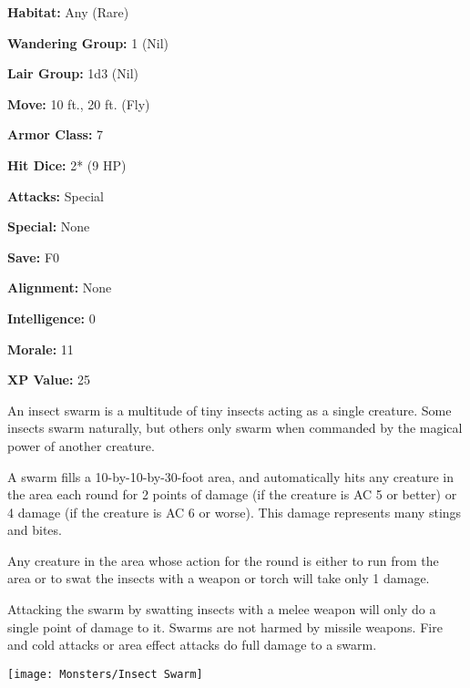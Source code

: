 \begin{multicols*}{2}
{\textbf{Habitat:} Any (Rare)

\textbf{Wandering Group:} 1 (Nil)

\textbf{Lair Group:} 1d3 (Nil)

\textbf{Move:} 10 ft., 20 ft. (Fly)

\textbf{Armor Class:} 7

\textbf{Hit Dice:} 2* (9 HP)

\textbf{Attacks:} Special

\textbf{Special:} None

\textbf{Save:} F0

\textbf{Alignment:} None

\textbf{Intelligence:} 0

\textbf{Morale:} 11

\textbf{XP Value:} 25}

An insect swarm is a multitude of tiny insects acting as a single creature. Some insects swarm naturally, but others only swarm when commanded by the magical power of another creature.

A swarm fills a 10-by-10-by-30-foot area, and automatically hits any creature in the area each round for 2 points of damage (if the creature is AC 5 or better) or 4 damage (if the creature is AC 6 or worse). This damage represents many stings and bites.

Any creature in the area whose action for the round is either to run from the area or to swat the insects with a weapon or torch will take only 1 damage.

Attacking the swarm by swatting insects with a melee weapon will only do a single point of damage to it. Swarms are not harmed by missile weapons. Fire and cold attacks or area effect attacks do full damage to a swarm.

\texttt{[image: Monsters/Insect Swarm]}


\end{multicols*}
